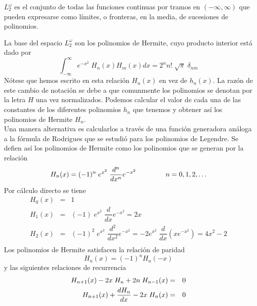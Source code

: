 \begin{teorema}
$L_{2}^{\omega}$ es el conjunto de todas las funciones continuas por tramos en $(-\infty, \infty)$ que pueden expresarse como límites, o fronteras, en la media, de sucesiones de polinomios.
\end{teorema}
La base del espacio $L_{2}^{\omega}$ son los polinomios de Hermite, cuyo producto interior está dado por
\begin{equation}
\int_{-\infty}^{\infty} e^{-x^{2}} \; H_{n}(x) H_{m}(x) dx = 2^{n} n! \; \sqrt{\pi} \; \delta_{nm}
\label{eq:ecuacion_06_34}
\end{equation}
Nótese que hemos escrito en esta relación $H_{n}(x)$ en vez de $h_{n}(x)$. La razón de este cambio de notación se debe a que comunmente los polinomios se denotan por la letra $H$ una vez normalizados. Podemos calcular el valor de cada una de las constantes de los diferentes polinomios $h_{n}$ que tenemos y obtener así los polinomios de Hermite $H_{n}$.
\\
Una manera alternativa es calcularlos a través de una función generadora análoga a la fórmula de Rodrigues que se estudió para los polinomios de Legendre. Se defien así los polinomios de Hermite como los polinomios que se generan por la relación
\begin{equation}
H_{n} (x) = (-1)^{n} \; e^{x^{2}} \; \dfrac{d^{n}}{d x^{n}} e^{-x^{2}} \hspace{1.5cm} n = 0, 1, 2, \ldots
\label{eq:ecuacion_06_35}
\end{equation}
Por cálculo directo se tiene
\begin{eqnarray}
H_{0}(x) &=& 1 \label{eq:ecuacion_06_36} \\
H_{1}(x) &=& (-1) \; e^{x^{2}} \; \dfrac{d}{dx} e^{-x^{2}} =  2x \label{eq:ecuacion_06_36} \\
H_{2}(x) &=& (-1)^{2} \; e^{x^{2}} \; \dfrac{d^{2}}{d x^{2}} e^{-x^{2}} =  -2 e^{x^{2}} \; \dfrac{d}{d x} \left( x e^{-x^{2}} \right) =  4x^{2} - 2 \label{eq:ecuacion_06_36} \\
\end{eqnarray}
Los polinomios de Hermite satisfacen la relación de paridad
\begin{equation}
H_{n}(x) = (-1)^{n} H_{n}(-x)
\label{eq:ecuacion_06_41}
\end{equation}
y las siguientes relaciones de recurrencia
\begin{eqnarray*}
H_{n + 1}(x) - 2 x \; H_{n} + 2n \; H_{n-1}(x) &=& 0 \nonumber \\
H_{n + 1}(x) + \dfrac{d H_{n}}{dx} - 2x \; H_{n}(x) &=& 0 \nonumber
\end{eqnarray*}
